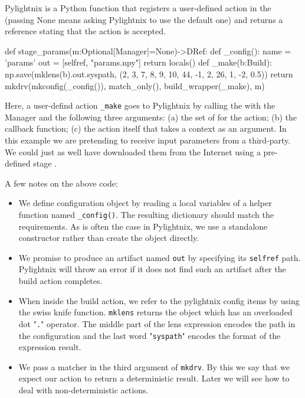Pylightnix  is a Python function that
registers a user-defined action in the 
(passing None means asking Pylightnix to use the default one) and returns a
 reference stating that the action is
accepted.

\begin{pythontexcode}
def stage_params(m:Optional[Manager]=None)->DRef:
  def _config():
    name = 'params'
    out = [selfref, "params.npy"]
    return locals()
  def _make(b:Build):
    np.save(mklens(b).out.syspath, (2, 3, 7, 8, 9, 10, 44, -1, 2, 26, 1, -2, 0.5))
  return mkdrv(mkconfig(_config()), match_only(), build_wrapper(_make), m)
\end{pythontexcode}

Here, a user-defind action \texttt{\_make} goes to Pylightnix by calling the
 with the Manager and the following three
arguments: (a) the set of  for the
action; (b) the  callback function; (c)
the action itself that takes a  context as
an argument. In this example we are pretending to receive input parameters from
a third-party. We could just as well have downloaded them from the Internet using
a pre-defined stage .

\hfill \break \noindent
A few notes on the above code:

\begin{itemize}
  \item We define configuration object by reading a local variables of a helper
    function named \texttt{\_config()}. The resulting dictionary should match
    the  requirements. As is often the
    case in Pylightnix, we use a standalone
     constructor rather than create the
    object directly.
  \item We promise to produce an artifact named \texttt{out} by specifying its
    \texttt{selfref} path. Pylightnix will throw an error if it does not find
    such an artifact after the build action completes.
  \item When inside the build action, we refer to the pylightnix config items by
    using the  swiss knife function.
    \texttt{mklens} returns the  object which
    has an overloaded dot "\texttt{.}" operator. The middle part of the lens
    expression encodes the path in the configuration and the last word
    "\texttt{syspath}" encodes the format of the expression result.
  \item We pass a  matcher in
    the third argument of \texttt{mkdrv}. By this we say that we expect our
    action to return a deterministic result. Later we will see how to deal with
    non-deterministic actions.
  \end{itemize}

